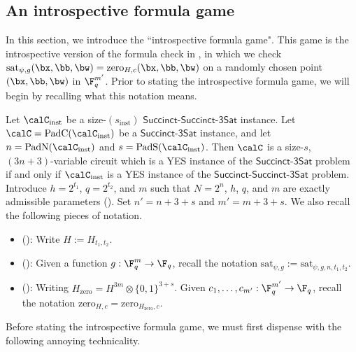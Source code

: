 \documentclass[11pt]{article}
\newcommand{\succinct}{\mathsf{Succinct}\text{-}\mathsf{3Sat}}
\newcommand{\succinctsquared}{\mathsf{Succinct}\text{-}\mathsf{Succinct}\text{-}\mathsf{3Sat}}
\begin{document}
\subsection{An introspective formula game}\label{sec:introspective-formula}

In this section, we introduce the ``introspective formula game".
This game is the introspective version of the formula check in ,
in which we check $\mathrm{sat}_{\psi, g}(\bx, \bb, \bw) = \mathrm{zero}_{H, c}(\bx, \bb, \bw)$
on a randomly chosen point $(\bx, \bb, \bw)$ in $\F_q^{m'}$.
Prior to stating the introspective formula game,
we will begin by recalling what this notation means.

Let $\calC_{\mathrm{inst}}$ be a size-$(s_{\mathrm{inst}})$ $\succinctsquared$ instance.
Let $\calC = \mathrm{PadC}(\calC_{\mathrm{inst}})$ be a $\succinct$ instance,
and let $n = \mathrm{PadN}(\calC_{\mathrm{inst}})$ and $s = \mathrm{PadS}(\calC_{\mathrm{inst}})$.
Then $\calC$ is a size-$s$, $(3n+3)$-variable circuit
which is a YES instance of the $\succinct$ problem if and only if $\calC_{\mathrm{inst}}$
is a YES instance of the $\succinctsquared$  problem.
Introduce $h = 2^{t_1}$, $q = 2^{t_2}$, and $m$ such that $N=2^n$, $h$, $q$, and $m$ are exactly admissible parameters ().
Set $n' = n + 3 + s$ and $m' = m + 3 + s$.
We also recall the following pieces of notation.
\begin{itemize}
\item[$\circ$] (): Write $H := H_{t_1, t_2}$.
\item[$\circ$]  (): Given a function $g:\F_q^m \rightarrow \F_q$,
recall the notation $\mathrm{sat}_{\psi,g} := \mathrm{sat}_{\psi,g, n, t_1, t_2}$.
\item[$\circ$]  (): Writing $H_{\mathrm{zero}} = H^{3m} \otimes \{0, 1\}^{3 + s}$.
Given $c_1, \ldots, c_{m'} : \F_q^{m'} \rightarrow \F_q$, recall the notation $\mathrm{zero}_{H,c} = \mathrm{zero}_{H_{\mathrm{zero}}, c}$.
\end{itemize}

Before stating the introspective formula game, we must first dispense with the following annoying technicality.
\end{document}
